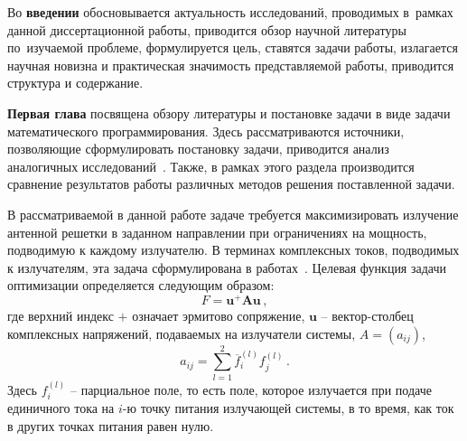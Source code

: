 Во {\textbf{введении}} обосновывается актуальность
исследований, проводимых в~рамках данной диссертационной работы,
приводится обзор научной литературы по~изучаемой проблеме,
формулируется цель, ставятся задачи работы, излагается научная новизна
и практическая значимость представляемой работы, приводится структура и содержание.

{\textbf{Первая глава}} посвящена обзору литературы и постановке задачи в виде задачи математического программирования. Здесь рассматриваются источники, позволяющие сформулировать постановку задачи, приводится анализ аналогичных
исследований~. Также, в рамках этого раздела производится сравнение результатов работы различных методов решения поставленной задачи.

В рассматриваемой в данной работе задаче требуется максимизировать излучение антенной решетки в заданном направлении при ограничениях на мощность, подводимую к каждому излучателю. В терминах комплексных токов, подводимых к излучателям, эта задача сформулирована в работах~. Целевая функция задачи оптимизации определяется следующим образом:
%
    \begin{equation}
        F = \textbf{u}^{+}\textbf{Au} \, ,
        \label{eq:F_0}
    \end{equation}
%
где верхний индекс $+$ означает эрмитово сопряжение, $\textbf{u}$ -- вектор-столбец комплексных напряжений, подаваемых на излучатели системы, $A = (a_{ij})$,
%
     \begin{equation}
        a_{ij} = \sum_{l=1}^2\overline{f}_{i}^{(l)}f_{j}^{(l)}
        \label{eq:A_0} \, .
    \end{equation}
%
Здесь $f_i^{(l)}$ -- парциальное поле, то есть поле, которое излучается при подаче единичного тока на $i$-ю точку питания излучающей системы, в то время, как ток в других точках питания равен нулю.

